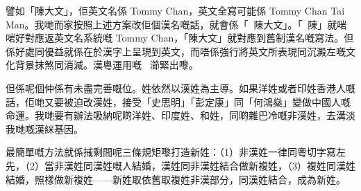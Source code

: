 \documentclass[a5paper, 10pt, openany]{book} %
\begin{document}
譬如「陳大文」，佢英文名係 Tommy Chan，英文全寫可能係 Tommy Chan Tai Man。我哋而家按照上述方案改佢個漢名嘅話，就會係「陳大文」。「陳」就啱啱好對應返英文名系統嘅 Tommy Chan，「陳大文」就對應到舊制漢名嘅寫法。但係好處同優益就係在於漢字上呈現到英文，而唔係強行將英文所表現同沉澱左嘅文化背景抹煞同消滅。漢粵運用嘅瀄緊出嚟。

但係呢個仲係有未盡完善嘅位。姓依然以漢姓為主導。如果洋姓或者印姓香港人嘅話，佢哋又要被迫改漢姓，接受「史思明」「彭定康」同「何鴻燊」變做中國人嘅命運。我哋要有辦法吸納呢啲洋姓、印度姓、和姓，同啲雜巴冷嘅非漢姓，去溝淡我哋嘅漢䋛基因。

最簡單嘅方法就係𢬿剩間呢三條規矩嚟打造新姓：（1）非漢姓一律同粵切字寫左先，（2）當非漢姓同漢姓嘅人結婚，漢姓同非漢姓結合做新複姓，（3）複姓同漢姓結婚，照樣做新複姓——新姓取依舊取複姓非漢部分，同漢姓結合，成為新姓。
\end{document}
